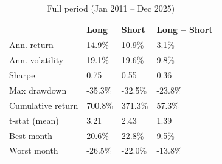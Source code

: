 \begin{table}
\caption{Full period (Jan 2011 – Dec 2025)}
\label{tab:full}
\begin{tabular}{llll}
\toprule
 & Long & Short & Long – Short \\
\midrule
Ann. return & 14.9\% & 10.9\% & 3.1\% \\
Ann. volatility & 19.1\% & 19.6\% & 9.8\% \\
Sharpe & 0.75 & 0.55 & 0.36 \\
Max drawdown & -35.3\% & -32.5\% & -23.8\% \\
Cumulative return & 700.8\% & 371.3\% & 57.3\% \\
t-stat (mean) & 3.21 & 2.43 & 1.39 \\
Best month & 20.6\% & 22.8\% & 9.5\% \\
Worst month & -26.5\% & -22.0\% & -13.8\% \\
\bottomrule
\end{tabular}
\end{table}
